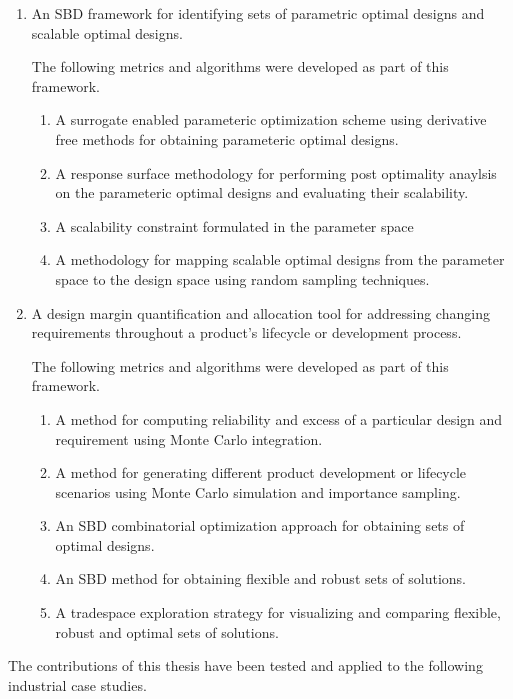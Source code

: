 \begin{enumerate}
	\item{An \ac{SBD} framework for identifying sets of parametric optimal designs and scalable optimal designs.}
	
	The following metrics and algorithms were developed as part of this framework.
	
	\begin{enumerate}
		\item{A surrogate enabled parameteric optimization scheme using derivative free methods for obtaining parameteric optimal designs.}
		\item{A response surface methodology for performing post optimality anaylsis on the parameteric optimal designs and evaluating their scalability.}
		\item{A scalability constraint formulated in the parameter space}
		\item{A methodology for mapping scalable optimal designs from the parameter space to the design space using random sampling techniques.}
	\end{enumerate}
	\item{A design margin quantification and allocation tool for addressing changing requirements throughout a product's lifecycle or development process.}
	
	The following metrics and algorithms were developed as part of this framework.
	
	\begin{enumerate}
		\item{A method for computing reliability and excess of a particular design and requirement using Monte Carlo integration.}
		\item{A method for generating different product development or lifecycle scenarios using Monte Carlo simulation and importance sampling.}
		\item{An \ac{SBD} combinatorial optimization approach for obtaining sets of optimal designs.}
		\item{An \ac{SBD} method for obtaining flexible and robust sets of solutions.}
		\item{A tradespace exploration strategy for visualizing and comparing flexible, robust and optimal sets of solutions.}
	\end{enumerate}
\end{enumerate}

The contributions of this thesis have been tested and applied to the following industrial case studies.

